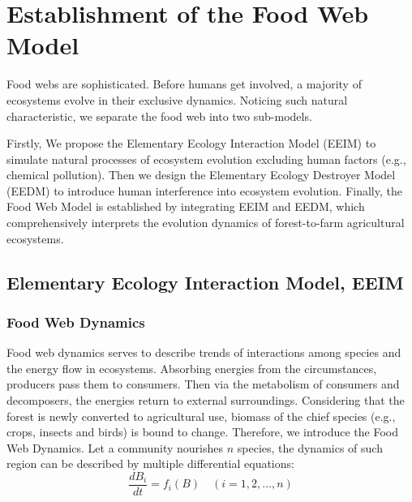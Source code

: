 \documentclass[12pt]{article}
\begin{document}
\section{Establishment of the Food Web Model}
\hspace{1.5em}Food webs are sophisticated. Before humans get involved, a majority of ecosystems evolve in their exclusive dynamics. Noticing such natural characteristic, we separate the food web into two sub-models. 

Firstly, We propose the Elementary Ecology Interaction Model (EEIM) to simulate natural processes of ecosystem evolution excluding human factors (e.g., chemical pollution). Then we design the Elementary Ecology Destroyer Model (EEDM) to introduce human interference into ecosystem evolution. Finally, the Food Web Model is established by integrating EEIM and EEDM, which comprehensively interprets the evolution dynamics of forest-to-farm agricultural ecosystems.
\subsection{Elementary Ecology Interaction Model, EEIM}
\subsubsection{Food Web Dynamics}
\hspace{1.5em}Food web dynamics serves to describe trends of interactions among species and the energy flow in ecosystems. Absorbing energies from the circumstances, producers pass them to consumers. Then via the metabolism of consumers and decomposers, the energies return to external surroundings. Considering that the forest is newly converted to agricultural use, biomass of the chief species (e.g., crops, insects and birds) is bound to change. Therefore, we introduce the Food Web Dynamics. Let a community nourishes $n$ species, the dynamics of such region can be described by multiple differential equations:
\begin{equation}
    \frac{dB_i}{dt}=f_i(B)\hspace{1em}(i=1,2,...,n)
    \label{Bi}
\end{equation}
\end{document}
